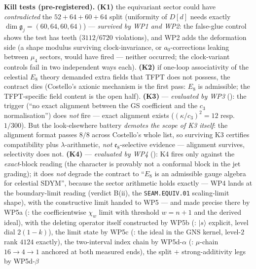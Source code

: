 \documentclass[11pt,a4paper]{article}
\newcommand{\cthree}{c_3}
\begin{document}
\par\smallskip\noindent\textbf{Kill tests (pre-registered).} \textbf{(K1)} the equivariant sector could
have \emph{contradicted} the $52{+}64{+}60{+}64$ split (uniformity of $D[d]$ needs exactly
$\dim\mathfrak g_j=(60,64,60,64)$) --- \emph{survived by WP1 and WP2}: the false-glue control shows the
test has teeth ($3112/6720$ violations), and WP2 adds the deformation side (a shape modulus surviving
clock-invariance, or $a_0$-corrections leaking between $\mu_4$ sectors, would have fired --- neither
occurred; the clock-variant controls fail in two independent ways each). \textbf{(K2)} if one-loop
associativity of the celestial
$E_8$ theory demanded extra fields that TFPT does not possess, the contract dies (Costello's axionic
mechanism is the first pass: $E_8$ is admissible; the TFPT-specific field content is the open half).
\textbf{(K3)} --- \emph{evaluated by WP3} (): the trigger
(``no exact alignment between the GS coefficient and the $\cthree$ normalisation'') does \emph{not} fire
--- exact alignment exists ($(\kappa/\cthree)^2=12$ resp.\ $1/300$). But the look-elsewhere battery
\emph{demotes the scope of K3 itself}: the alignment format passes $8/8$ across Costello's whole list, so
surviving K3 certifies compatibility plus $\lambda$-arithmetic, \emph{not} $\mathfrak e_8$-selective
evidence --- alignment survives, selectivity does not.
\textbf{(K4)} --- \emph{evaluated by WP4} (): K4 fires
only against the \emph{exact}-block reading (the character is provably not a conformal block in the jet
grading); it does \emph{not} degrade the contract to ``$E_8$ is an admissible gauge algebra for celestial
SDYM'', because the sector arithmetic holds exactly --- WP4 lands at the boundary-limit reading (verdict
B(ii), the \texttt{SEAM.EQUIV.01} scaling-limit shape), with the constructive limit handed to WP5 ---
and made precise there by WP5a (: the coefficientwise
$\chi_w$ limit with threshold $w=n{+}1$ and the derived ideal), with the deleting operator itself
constructed by WP5b (: $|s\rangle$ explicit, level
dial $2(1{-}k)$), the limit state by WP5c
(: the ideal in the GNS kernel, level-$2$ rank
$4124$ exactly), the two-interval index chain by WP5d-$\alpha$
(: $\mu$-chain $16\to4\to1$ anchored at both
measured ends), the split $+$ strong-additivity legs by WP5d-$\beta$
\end{document}
